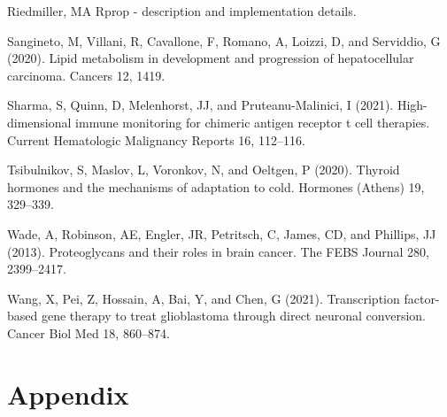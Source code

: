 \documentclass[
  parskip,
  oneside]{scrreprt}
\newlength{\cslhangindent}
\newlength{\cslentryspacingunit} %
\newenvironment{CSLReferences}[2] %
 {%
  \setlength{\parindent}{0pt}
  \ifodd #1
  \let\oldpar\par
  \def\par{\hangindent=\cslhangindent\oldpar}
  \fi
  \setlength{\parskip}{#2\cslentryspacingunit}
 }%
 {}
\begin{document}
\begin{CSLReferences}{0}{0}
\leavevmode{}%
Riedmiller, MA Rprop - description and implementation details.

\leavevmode{}%
Sangineto, M, Villani, R, Cavallone, F, Romano, A, Loizzi, D, and
Serviddio, G (2020). Lipid metabolism in development and progression of
hepatocellular carcinoma. Cancers 12, 1419.

\leavevmode{}%
Sharma, S, Quinn, D, Melenhorst, JJ, and Pruteanu-Malinici, I (2021).
High-dimensional immune monitoring for chimeric antigen receptor t cell
therapies. Current Hematologic Malignancy Reports 16, 112--116.

\leavevmode{}%
Tsibulnikov, S, Maslov, L, Voronkov, N, and Oeltgen, P (2020). Thyroid
hormones and the mechanisms of adaptation to cold. Hormones (Athens) 19,
329--339.

\leavevmode{}%
Wade, A, Robinson, AE, Engler, JR, Petritsch, C, James, CD, and
Phillips, JJ (2013). Proteoglycans and their roles in brain cancer. The
FEBS Journal 280, 2399--2417.

\leavevmode{}%
Wang, X, Pei, Z, Hossain, A, Bai, Y, and Chen, G (2021). Transcription
factor-based gene therapy to treat glioblastoma through direct neuronal
conversion. Cancer Biol Med 18, 860--874.

\end{CSLReferences}

\hypertarget{appendix}{%
\chapter{Appendix}\label{appendix}}
\end{document}
